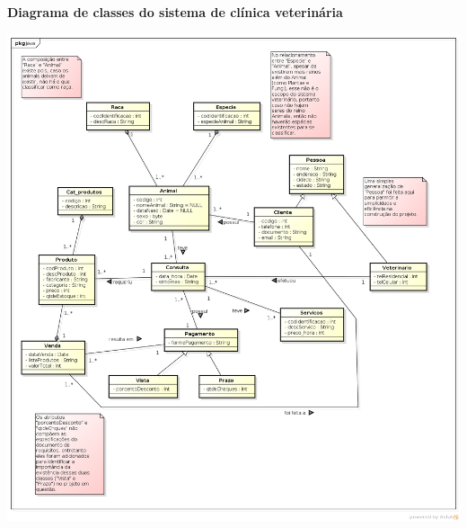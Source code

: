 \documentclass[12pt,a4paper]{article}
\begin{document}
	\begin{center}
		\textbf{Diagrama de classes do sistema de clínica veterinária}
	\end{center}
	\centering
	\includegraphics[natwidth = 200, natheight = 200]{Atividade1.png}
\end{document}
